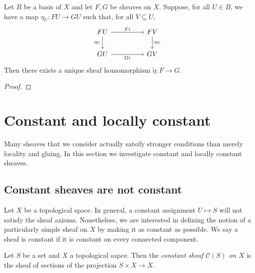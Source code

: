 \documentclass{article}
\begin{document}
\begin{lemma}
  Let $B$ be a basis of $X$ and let $F,G$ be sheaves on $X$. Suppose, for all $U\in B$,
  we have a map $\eta_U:FU\to GU$ such that, for all $V\subseteq U$,
  \begin{equation}
    \begin{tikzcd}
      FU && FV \\
      GU && GV
      \arrow["Fi", from=1-1, to=1-3]
      \arrow["{\eta_U}"', from=1-1, to=2-1]
      \arrow["{\eta_V}", from=1-3, to=2-3]
      \arrow["Gi"', from=2-1, to=2-3]
    \end{tikzcd}
  \end{equation}
  Then there exists a unique sheaf homomorphism $\tilde\eta : F\to G$.
  \begin{proof}
    \missingproof
  \end{proof}
\end{lemma}

\section{Constant and locally constant}\label{sec:locally_constant_sheaves}

Many sheaves that we consider actually satsify stronger conditions
than merely locality and gluing. In this section we investigate constant
and locally constant sheaves.

\subsection{Constant sheaves are not constant}

Let $X$ be a topological space. In general, a constant assignment
$U\mapsto S$ will not satisfy the sheaf axioms. Nonetheless,
we are interested in defining the notion of a particularly simple
sheaf on $X$ by making it as constant as possible. We say a sheaf
is constant if it is constant on every connected component.

\begin{definition}
  Let $S$ be a set and $X$ a topological sapce. Then
  the \emph{constant sheaf $\mathscr C(S)$ on $X$} is the sheaf of sections
  of the projection $S\times X\to X$.
\end{definition}
\end{document}
